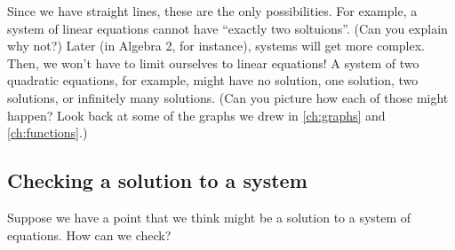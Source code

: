 Since we have straight lines, these are the only possibilities. For example, a system of linear equations cannot have ``exactly two soltuions''. (Can you explain why not?) Later (in Algebra 2, for instance), systems will get more complex. Then, we won't have to limit ourselves to linear equations! A system of two quadratic equations, for example, might have no solution, one solution, two solutions, or infinitely many solutions. (Can you picture how each of those might happen? Look back at some of the graphs we drew in \cref{ch:graphs} and \cref{ch:functions}.)


\subsection{Checking a solution to a system}

Suppose we have a point that we think might be a solution to a system of equations. How can we check?

